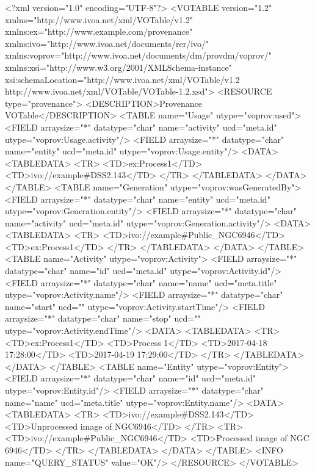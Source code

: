 \begin{verbnobox}[\scriptsize]

<?xml version="1.0" encoding="UTF-8"?>
<VOTABLE version="1.2" xmlns="http://www.ivoa.net/xml/VOTable/v1.2" xmlns:ex="http://www.example.com/provenance" xmlns:ivo="http://www.ivoa.net/documents/rer/ivo/" xmlns:voprov="http://www.ivoa.net/documents/dm/provdm/voprov/" xmlns:xsi="http://www.w3.org/2001/XMLSchema-instance" xsi:schemaLocation="http://www.ivoa.net/xml/VOTable/v1.2 http://www.ivoa.net/xml/VOTable/VOTable-1.2.xsd">
  <RESOURCE type="provenance">
    <DESCRIPTION>Provenance VOTable</DESCRIPTION>
    <TABLE name="Usage" utype="voprov:used">
      <FIELD arraysize="*" datatype="char" name="activity" ucd="meta.id" utype="voprov:Usage.activity"/>
      <FIELD arraysize="*" datatype="char" name="entity" ucd="meta.id" utype="voprov:Usage.entity"/>
      <DATA>
        <TABLEDATA>
          <TR>
            <TD>ex:Process1</TD>
            <TD>ivo://example#DSS2.143</TD>
          </TR>
        </TABLEDATA>
      </DATA>
    </TABLE>
    <TABLE name="Generation" utype="voprov:wasGeneratedBy">
      <FIELD arraysize="*" datatype="char" name="entity" ucd="meta.id" utype="voprov:Generation.entity"/>
      <FIELD arraysize="*" datatype="char" name="activity" ucd="meta.id" utype="voprov:Generation.activity"/>
      <DATA>
        <TABLEDATA>
          <TR>
            <TD>ivo://example#Public_NGC6946</TD>
            <TD>ex:Process1</TD>
          </TR>
        </TABLEDATA>
      </DATA>
    </TABLE>
    <TABLE name="Activity" utype="voprov:Activity">
      <FIELD arraysize="*" datatype="char" name="id" ucd="meta.id" utype="voprov:Activity.id"/>
      <FIELD arraysize="*" datatype="char" name="name" ucd="meta.title" utype="voprov:Activity.name"/>
      <FIELD arraysize="*" datatype="char" name="start" ucd="" utype="voprov:Activity.startTime"/>
      <FIELD arraysize="*" datatype="char" name="stop" ucd="" utype="voprov:Activity.endTime"/>
      <DATA>
        <TABLEDATA>
          <TR>
            <TD>ex:Process1</TD>
            <TD>Process 1</TD>
            <TD>2017-04-18 17:28:00</TD>
            <TD>2017-04-19 17:29:00</TD>
          </TR>
        </TABLEDATA>
      </DATA>
    </TABLE>
    <TABLE name="Entity" utype="voprov:Entity">
      <FIELD arraysize="*" datatype="char" name="id" ucd="meta.id" utype="voprov:Entity.id"/>
      <FIELD arraysize="*" datatype="char" name="name" ucd="meta.title" utype="voprov:Entity.name"/>
      <DATA>
        <TABLEDATA>
          <TR>
            <TD>ivo://example#DSS2.143</TD>
            <TD>Unprocessed image of NGC6946</TD>
          </TR>
          <TR>
            <TD>ivo://example#Public_NGC6946</TD>
            <TD>Processed image of NGC 6946</TD>
          </TR>
        </TABLEDATA>
      </DATA>
    </TABLE>
    <INFO name="QUERY_STATUS" value="OK"/>
  </RESOURCE>
</VOTABLE>

\end{verbnobox}

